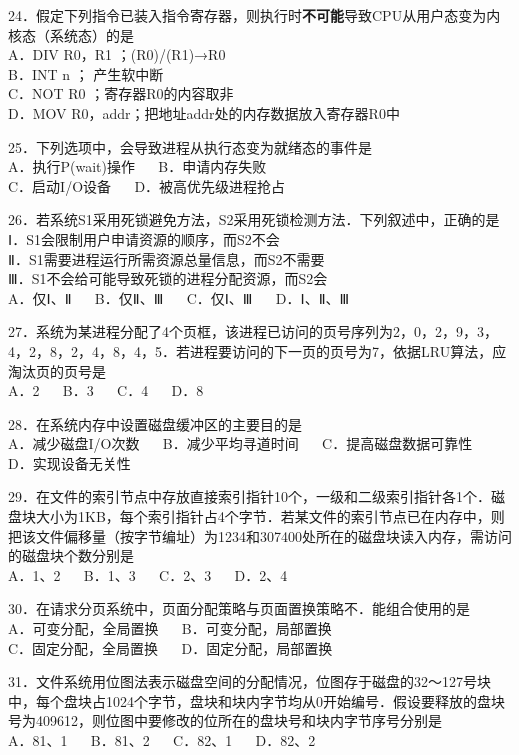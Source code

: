 24．假定下列指令已装入指令寄存器，则执行时\textbf{不可能}导致CPU从用户态变为内核态（系统态）的是 \\
A．DIV R0，R1 ；(R0)/(R1)→R0 \\
B．INT n ； 产生软中断 \\
C．NOT R0 ；寄存器R0的内容取非 \\
D．MOV R0，addr；把地址addr处的内存数据放入寄存器R0中

25．下列选项中，会导致进程从执行态变为就绪态的事件是 \\
A．执行P(wait)操作 $\quad$ B．申请内存失败 \\
C．启动I/O设备 $\quad$ D．被高优先级进程抢占

26．若系统S1采用死锁避免方法，S2采用死锁检测方法．下列叙述中，正确的是 \\
Ⅰ．S1会限制用户申请资源的顺序，而S2不会 \\
Ⅱ．S1需要进程运行所需资源总量信息，而S2不需要 \\
Ⅲ．S1不会给可能导致死锁的进程分配资源，而S2会 \\
A．仅Ⅰ、Ⅱ $\quad$ B．仅Ⅱ、Ⅲ $\quad$ C．仅Ⅰ、Ⅲ $\quad$ D．Ⅰ、Ⅱ、Ⅲ

27．系统为某进程分配了4个页框，该进程已访问的页号序列为2，0，2，9，3，4，2，8，2，4，8，4，5．若进程要访问的下一页的页号为7，依据LRU算法，应淘汰页的页号是 \\
A．2 $\quad$ B．3 $\quad$ C．4 $\quad$ D．8

28．在系统内存中设置磁盘缓冲区的主要目的是 \\
A．减少磁盘I/O次数 $\quad$ B．减少平均寻道时间 $\quad$ C．提高磁盘数据可靠性 $\quad$ D．实现设备无关性

29．在文件的索引节点中存放直接索引指针10个，一级和二级索引指针各1个．磁盘块大小为1KB，每个索引指针占4个字节．若某文件的索引节点已在内存中，则把该文件偏移量（按字节编址）为1234和307400处所在的磁盘块读入内存，需访问的磁盘块个数分别是 \\
A．1、2 $\quad$ B．1、3 $\quad$ C．2、3 $\quad$ D．2、4

30．在请求分页系统中，页面分配策略与页面置换策略不．能组合使用的是 \\
A．可变分配，全局置换 $\quad$ B．可变分配，局部置换 \\
C．固定分配，全局置换 $\quad$ D．固定分配，局部置换

31．文件系统用位图法表示磁盘空间的分配情况，位图存于磁盘的32～127号块中，每个盘块占1024个字节，盘块和块内字节均从0开始编号．假设要释放的盘块号为409612，则位图中要修改的位所在的盘块号和块内字节序号分别是 \\
A．81、1 $\quad$ B．81、2 $\quad$ C．82、1 $\quad$ D．82、2

